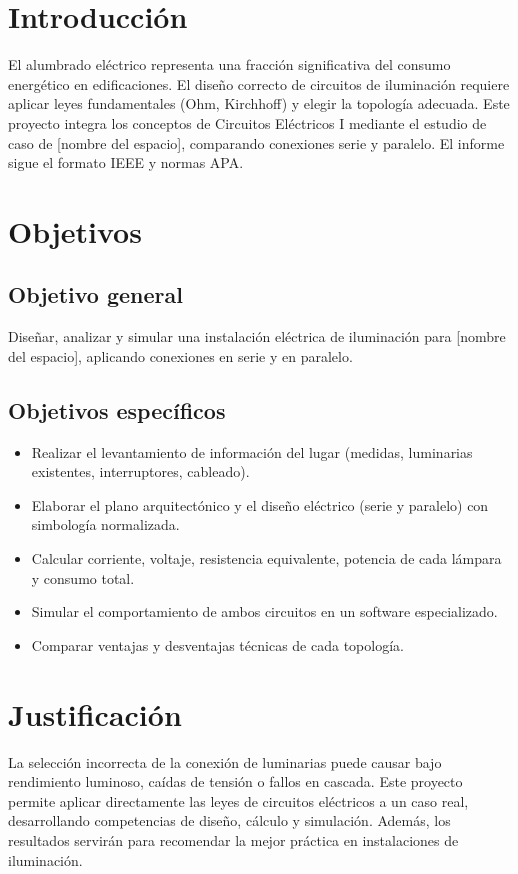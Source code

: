 
\section{Introducción}
El alumbrado eléctrico representa una fracción significativa del consumo energético en edificaciones. El diseño correcto de circuitos de iluminación requiere aplicar leyes fundamentales (Ohm, Kirchhoff) y elegir la topología adecuada. Este proyecto integra los conceptos de Circuitos Eléctricos I mediante el estudio de caso de [nombre del espacio], comparando conexiones serie y paralelo. El informe sigue el formato IEEE y normas APA.

\section{Objetivos}
\subsection{Objetivo general}
Diseñar, analizar y simular una instalación eléctrica de iluminación para [nombre del espacio], aplicando conexiones en serie y en paralelo.

\subsection{Objetivos específicos}
\begin{itemize}
    \item Realizar el levantamiento de información del lugar (medidas, luminarias existentes, interruptores, cableado).
    \item Elaborar el plano arquitectónico y el diseño eléctrico (serie y paralelo) con simbología normalizada.
    \item Calcular corriente, voltaje, resistencia equivalente, potencia de cada lámpara y consumo total.
    \item Simular el comportamiento de ambos circuitos en un software especializado.
    \item Comparar ventajas y desventajas técnicas de cada topología.
\end{itemize}

\section{Justificación}
La selección incorrecta de la conexión de luminarias puede causar bajo rendimiento luminoso, caídas de tensión o fallos en cascada. Este proyecto permite aplicar directamente las leyes de circuitos eléctricos a un caso real, desarrollando competencias de diseño, cálculo y simulación. Además, los resultados servirán para recomendar la mejor práctica en instalaciones de iluminación.

